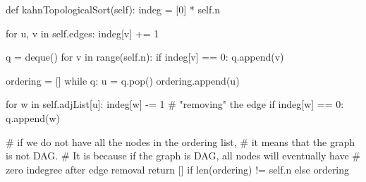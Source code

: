 \begin{python}
    def kahnTopologicalSort(self):
        indeg = [0] * self.n

        for u, v in self.edges:
            indeg[v] += 1

        q = deque()
        for v in range(self.n):
            if indeg[v] == 0:
                q.append(v)

        ordering = []
        while q:
            u = q.pop()
            ordering.append(u)

            for w in self.adjList[u]:
                indeg[w] -= 1  # "removing" the edge
                if indeg[w] == 0:
                    q.append(w)

        # if we do not have all the nodes in the ordering list,
        # it means that the graph is not DAG.
        # It is because if the graph is DAG, all nodes will eventually have
        # zero indegree after edge removal
        return [] if len(ordering) != self.n else ordering
\end{python}
